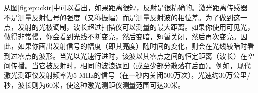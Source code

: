 
从图\ref{fig:epuckir}中可以看出，如果距离很短，反射是很精确的。激光距离传感器不是测量反射信号的强度（又称振幅）而是测量反射波的相位差。为了做到这一点，发射的光被调制，波长超过扫描仪可以测量的最大距离。如果你使用可见光，做得非常慢，你会看到光线不断变亮，然后变暗，短暂关闭，然后再次变亮。因此，如果你画出发射信号的幅度（即其亮度）随时间的变化，则会在光线较暗时看到过零点的波形。当光以光速行进时，该波以其零点之间的恒定距离（波长）在空间传播。当它被反射时，相同的波浪返回（或至少部分散落在后面）。例如，现代激光测距仪发射频率为5 MHz的信号（在一秒内关闭500万次）。光速约30万公里/秒，波长则为60米，使这种激光测距仪测量范围可达30米。



